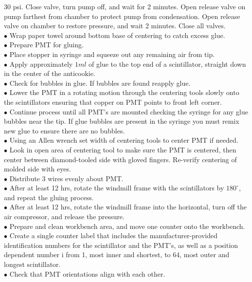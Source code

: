  $30$ psi. Close valve, turn pump off, and wait for 2 minutes. Open release valve on pump farthest from chamber to protect pump from condensation. Open release valve on chamber to restore pressure, and wait 2 minutes. Close all valves.\\
$\bullet$ Wrap paper towel around bottom base of centering to catch excess glue.\\
$\bullet$ Prepare PMT for gluing.\\
$\bullet$ Place stopper in syringe and squeeze out any remaining air from tip.\\
$\bullet$ Apply approximately $1 ml$ of glue to the top end of a scintillator, straight down in the center of the anticookie.\\
$\bullet$ Check for bubbles in glue. If bubbles are found reapply glue.\\
$\bullet$ Lower the PMT in a rotating motion through the centering tools slowly onto the scintillators ensuring that copper on PMT points to front left corner.\\
$\bullet$ Continue process until all PMT's are mounted checking the syringe for any glue bubbles near the tip. If glue bubbles are present in the syringe you must remix new glue to ensure there are no bubbles.\\
$\bullet$ Using an Allen wrench set width of centering tools to center PMT if needed.\\
$\bullet$ Look in open area of centering tool to make sure the PMT is centered, then center between diamond-tooled side with gloved fingers. Re-verify centering of molded side with eyes.\\
$\bullet$ Distribute 3 wires evenly about PMT.\\
$\bullet$ After at least 12 hrs, rotate the windmill frame with the scintillators by $180^{\circ}$, and repeat the gluing process.\\
$\bullet$ After at least 12 hrs, rotate the windmill frame into the horizontal, turn off the air compressor, and release the pressure.\\
$\bullet$ Prepare and clean workbench area, and move one counter onto the workbench.\\
$\bullet$ Create a single counter label that includes the manufacturer-provided identification numbers for the scintillator and the PMT's, as well as a position dependent number i from 1, most inner and shortest, to 64, most outer and longest scintillator.\\
$\bullet$ Check that PMT orientations align with each other.\\
